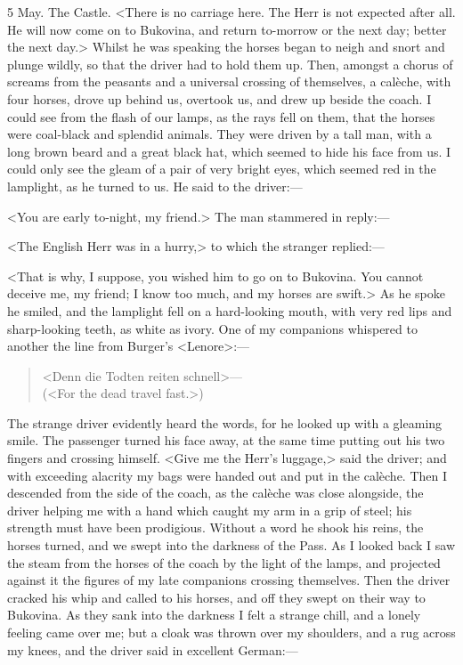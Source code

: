 \begin{diary}{5 May. The Castle.}
<There is no carriage here. The Herr is not expected after all. He will now come on to Bukovina, and return to-morrow or the next day; better the next day.> Whilst he was speaking the horses began to neigh and snort and plunge wildly, so that the driver had to hold them up. Then, amongst a chorus of screams from the peasants and a universal crossing of themselves, a calèche, with four horses, drove up behind us, overtook us, and drew up beside the coach. I could see from the flash of our lamps, as the rays fell on them, that the horses were coal-black and splendid animals. They were driven by a tall man, with a long brown beard and a great black hat, which seemed to hide his face from us. I could only see the gleam of a pair of very bright eyes, which seemed red in the lamplight, as he turned to us. He said to the driver:—

<You are early to-night, my friend.> The man stammered in reply:—

<The English Herr was in a hurry,> to which the stranger replied:—

<That is why, I suppose, you wished him to go on to Bukovina. You cannot deceive me, my friend; I know too much, and my horses are swift.> As he spoke he smiled, and the lamplight fell on a hard-looking mouth, with very red lips and sharp-looking teeth, as white as ivory. One of my companions whispered to another the line from Burger's <Lenore>:—

\begin{quote}
<Denn die Todten reiten schnell>—\\
(<For the dead travel fast.>)
\end{quote}

The strange driver evidently heard the words, for he looked up with a gleaming smile. The passenger turned his face away, at the same time putting out his two fingers and crossing himself. <Give me the Herr's luggage,> said the driver; and with exceeding alacrity my bags were handed out and put in the calèche. Then I descended from the side of the coach, as the calèche was close alongside, the driver helping me with a hand which caught my arm in a grip of steel; his strength must have been prodigious. Without a word he shook his reins, the horses turned, and we swept into the darkness of the Pass. As I looked back I saw the steam from the horses of the coach by the light of the lamps, and projected against it the figures of my late companions crossing themselves. Then the driver cracked his whip and called to his horses, and off they swept on their way to Bukovina. As they sank into the darkness I felt a strange chill, and a lonely feeling came over me; but a cloak was thrown over my shoulders, and a rug across my knees, and the driver said in excellent German:—


\end{diary}
